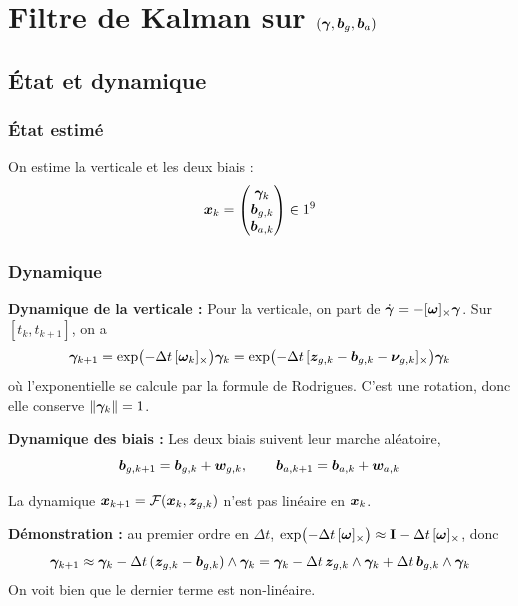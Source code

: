
\section{Filtre de Kalman sur \texorpdfstring{$(\bm{\gamma}, \bm{b}_g, \bm{b}_a)$}{(gamma, bg, ba)}}

\subsection{État et dynamique}
\subsubsection{État estimé}
On estime la verticale et les deux biais : 
\[
    \bm{x}_k = \begin{pmatrix} \bm{\gamma}_k \\ \bm{b}_{g,k} \\ \bm{b}_{a,k} \end{pmatrix} \in 1^9
\]

\subsubsection{Dynamique}
\textbf{Dynamique de la verticale : }Pour la verticale, on part de $\dot{\bm{\gamma}} = -[\bm{\omega}]_{\times}\bm{\gamma}$. Sur $[t_k, t_{k+1}]$, on a
\[
    \bm{\gamma}_{k+1} = \exp\bigl(-\Delta t\,[\bm{\omega}_k]_{\times}\bigr)\bm{\gamma}_k
    = \exp\bigl(-\Delta t\,[\bm{z}_{g,k} - \bm{b}_{g,k} - \bm{\nu}_{g,k}]_{\times}\bigr)\bm{\gamma}_k
\]
où l'exponentielle se calcule par la formule de Rodrigues. C'est une
rotation, donc elle conserve $\|\bm{\gamma}_k\| = 1$.

\textbf{Dynamique des biais : } Les deux biais suivent leur marche
aléatoire,
\[
    \bm{b}_{g,k+1} = \bm{b}_{g,k} + \bm{w}_{g,k},
    \qquad
    \bm{b}_{a,k+1} = \bm{b}_{a,k} + \bm{w}_{a,k}
\]


\begin{proposition}
    La dynamique $\bm{x}_{k+1} = \mathcal{F}(\bm{x}_k, \bm{z}_{g,k})$
    n'est pas linéaire en $\bm{x}_k$.
\end{proposition}
\textbf{Démonstration : } au premier ordre en $\Delta t$,
$\exp\bigl(-\Delta t\,[\bm{\omega}]_{\times}\bigr) \approx \mathbf{I} - \Delta t\,[\bm{\omega}]_{\times}$,
donc
\[
    \bm{\gamma}_{k+1} \approx \bm{\gamma}_k - \Delta t\,(\bm{z}_{g,k} - \bm{b}_{g,k})\wedge\bm{\gamma}_k
    = \bm{\gamma}_k - \Delta t\,\bm{z}_{g,k}\wedge\bm{\gamma}_k
    + \Delta t\,\bm{b}_{g,k}\wedge\bm{\gamma}_k
\]
On voit bien que le dernier terme est non-linéaire.
